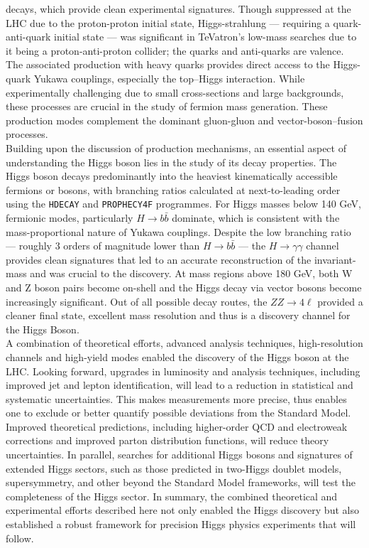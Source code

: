 \documentclass[a4paper,11pt]{article}
\begin{document}
decays, which provide clean experimental signatures. Though suppressed at the LHC due to the proton-proton initial state, Higgs-strahlung --- requiring a quark-anti-quark initial state --- was significant in TeVatron's low-mass searches due to it being a proton-anti-proton collider; the quarks and anti-quarks are valence. The associated production with heavy quarks provides direct access to the Higgs-quark Yukawa couplings, especially the top–Higgs interaction. While experimentally challenging due to small cross-sections and large backgrounds, these processes are crucial in the study of fermion mass generation. These production modes complement the dominant gluon-gluon and vector-boson–fusion processes.\\

Building upon the discussion of production mechanisms, an essential aspect of understanding the Higgs boson lies in the study of its decay properties. The Higgs boson decays predominantly into the heaviest kinematically accessible fermions or bosons, with branching ratios calculated at next-to-leading order using the \verb|HDECAY| and \verb|PROPHECY4F| programmes. For Higgs masses below 140 GeV, fermionic modes, particularly $H \rightarrow b \bar{b}$ dominate, which is consistent with the mass-proportional nature of Yukawa couplings. Despite the low branching ratio --- roughly 3 orders of magnitude lower than $H \rightarrow b\bar{b}$ --- the $H \rightarrow \gamma \gamma$ channel provides clean signatures that led to an accurate reconstruction of the invariant-mass and was crucial to the discovery. At mass regions above 180 GeV, both W and Z boson pairs become on-shell and the Higgs decay via vector bosons become increasingly significant. Out of all possible decay routes, the $ZZ \rightarrow 4\ell$ provided a cleaner final state, excellent mass resolution and thus is a discovery channel for the Higgs Boson.\\

 A combination of theoretical efforts, advanced analysis techniques, high-resolution channels and high-yield modes enabled the discovery of the Higgs boson at the LHC. Looking forward, upgrades in luminosity and analysis techniques, including improved jet and lepton identification, will lead to a reduction in statistical and systematic uncertainties. This makes measurements more precise, thus enables one to exclude or better quantify possible deviations from the Standard Model. Improved theoretical predictions, including higher-order QCD and electroweak corrections and improved parton distribution functions, will reduce theory uncertainties. In parallel, searches for additional Higgs bosons and signatures of extended Higgs sectors, such as those predicted in two-Higgs doublet models, supersymmetry, and other beyond the Standard Model frameworks, will test the completeness of the Higgs sector. In summary, the combined theoretical and experimental efforts described here not only enabled the Higgs discovery but also established a robust framework for precision Higgs physics experiments that will follow.






\end{document}
